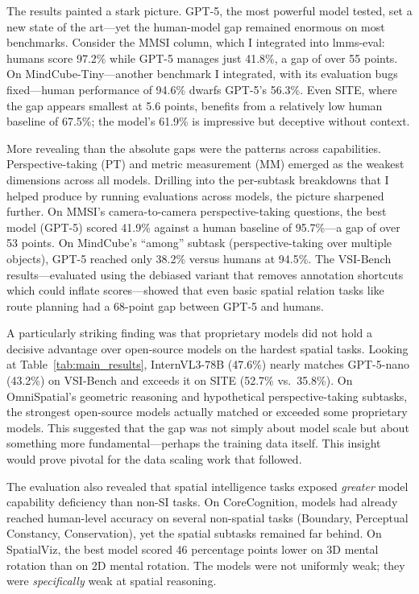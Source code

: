 \documentclass[
hf,
]{confart}
\begin{document}
The results painted a stark picture. GPT-5, the most powerful model tested, set a new state of the art---yet the human-model gap remained enormous on most benchmarks. Consider the MMSI column, which I integrated into lmms-eval: humans score 97.2\% while GPT-5 manages just 41.8\%, a gap of over 55 points. On MindCube-Tiny---another benchmark I integrated, with its evaluation bugs fixed---human performance of 94.6\% dwarfs GPT-5's 56.3\%. Even SITE, where the gap appears smallest at 5.6 points, benefits from a relatively low human baseline of 67.5\%; the model's 61.9\% is impressive but deceptive without context.

More revealing than the absolute gaps were the patterns across capabilities. Perspective-taking (PT) and metric measurement (MM) emerged as the weakest dimensions across all models. Drilling into the per-subtask breakdowns that I helped produce by running evaluations across models, the picture sharpened further. On MMSI's camera-to-camera perspective-taking questions, the best model (GPT-5) scored 41.9\% against a human baseline of 95.7\%---a gap of over 53 points. On MindCube's ``among'' subtask (perspective-taking over multiple objects), GPT-5 reached only 38.2\% versus humans at 94.5\%. The VSI-Bench results---evaluated using the debiased variant that removes annotation shortcuts which could inflate scores---showed that even basic spatial relation tasks like route planning had a 68-point gap between GPT-5 and humans.

A particularly striking finding was that proprietary models did not hold a decisive advantage over open-source models on the hardest spatial tasks. Looking at Table~\ref{tab:main_results}, InternVL3-78B (47.6\%) nearly matches GPT-5-nano (43.2\%) on VSI-Bench and exceeds it on SITE (52.7\% vs.\ 35.8\%). On OmniSpatial's geometric reasoning and hypothetical perspective-taking subtasks, the strongest open-source models actually matched or exceeded some proprietary models. This suggested that the gap was not simply about model scale but about something more fundamental---perhaps the training data itself. This insight would prove pivotal for the data scaling work that followed.

The evaluation also revealed that spatial intelligence tasks exposed \textit{greater} model capability deficiency than non-SI tasks. On CoreCognition, models had already reached human-level accuracy on several non-spatial tasks (Boundary, Perceptual Constancy, Conservation), yet the spatial subtasks remained far behind. On SpatialViz, the best model scored 46 percentage points lower on 3D mental rotation than on 2D mental rotation. The models were not uniformly weak; they were \textit{specifically} weak at spatial reasoning.
\end{document}
